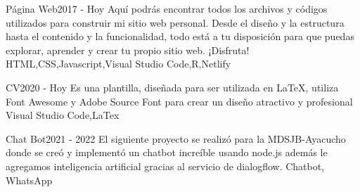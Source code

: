 
\begin{projects}

	\project
	{Página Web}{2017 - Hoy}
	{ }
	{Aquí podrás encontrar todos los archivos y códigos utilizados para construir mi sitio web personal. Desde el diseño y la estructura hasta el contenido y la funcionalidad, todo está a tu disposición para que puedas explorar, aprender y crear tu propio sitio web. ¡Disfruta!}
	{HTML,CSS,Javascript,Visual Studio Code,R,Netlify}

	\project
	{CV}{2020 - Hoy}
	{ }
	{Es una plantilla, diseñada para ser utilizada en LaTeX, utiliza Font Awesome y Adobe Source Font para crear un diseño atractivo y profesional}
	{Visual Studio Code,LaTex}

	\project
	{Chat Bot}{2021 - 2022}
	{ }
	{El siguiente proyecto se realizó para la MDSJB-Ayacucho donde se creó y implementó un chatbot increíble usando node.js además le agregamos inteligencia artificial gracias al servicio de dialogflow.}
	{Chatbot, WhatsApp}

\end{projects}
